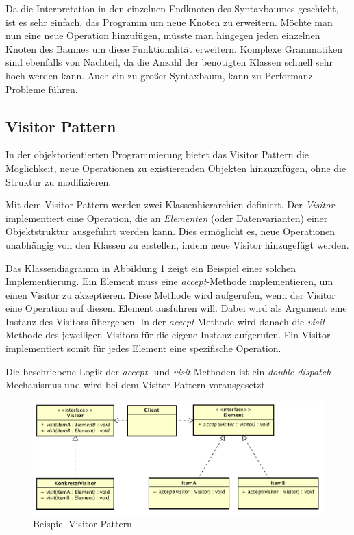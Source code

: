 \documentclass{llncs}
\begin{document}
Da die Interpretation in den einzelnen Endknoten des Syntaxbaumes geschieht, ist es sehr einfach, das Programm um neue Knoten zu erweitern. Möchte man nun eine neue Operation hinzufügen, müsste man hingegen jeden einzelnen Knoten des Baumes um diese Funktionalität erweitern. Komplexe Grammatiken sind ebenfalls von Nachteil, da die Anzahl der benötigten Klassen schnell sehr hoch werden kann. Auch ein zu großer Syntaxbaum, kann zu Performanz Probleme führen. 
\cite{hills2011case}

\subsection{Visitor Pattern} \label{sec:visitor}
In der objektorientierten Programmierung bietet das Visitor Pattern die Möglichkeit, neue Operationen zu existierenden Objekten hinzuzufügen, ohne die Struktur zu modifizieren.

Mit dem Visitor Pattern werden zwei Klassenhierarchien definiert. Der \textit{Visitor} implementiert eine Operation, die an \textit{Elementen} (oder Datenvarianten) einer Objektstruktur ausgeführt werden kann. Dies ermöglicht es, neue Operationen unabhängig von den Klassen zu erstellen, indem neue Visitor hinzugefügt werden. \cite{GHJV94}

Das Klassendiagramm in Abbildung \ref{fig:visitor-pattern} zeigt ein Beispiel einer solchen Implementierung. Ein Element muss eine \textit{accept}-Methode implementieren, um einen Visitor zu akzeptieren. Diese Methode wird aufgerufen, wenn der Visitor eine Operation auf diesem Element ausführen will. Dabei wird als Argument eine Instanz des Visitors übergeben. In der \textit{accept}-Methode wird danach die \textit{visit}-Methode des jeweiligen Visitors für die eigene Instanz aufgerufen. Ein Visitor implementiert somit für jedes Element eine spezifische Operation.

Die beschriebene Logik der \textit{accept}- und \textit{visit}-Methoden ist ein \textit{double-dispatch} Mechanismus und wird bei dem Visitor Pattern vorausgesetzt.

\begin{figure}[h]
	\centering
	\includegraphics[width=\textwidth]{images/VisitorPattern.png}
	\caption{Beispiel Visitor Pattern}
	\label{fig:visitor-pattern}
\end{figure}
\end{document}
